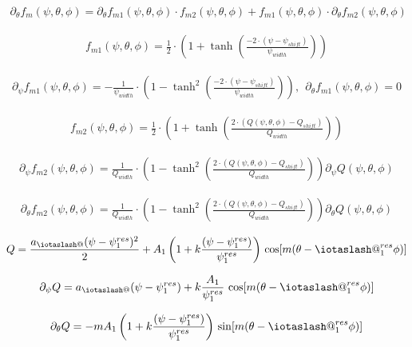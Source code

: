 \documentclass[11pt,a4paper,oneside]{article}
\makeatletter
\newcommand{\iotaslash}{{\mathpalette\iotaslash@\relax}}
\newcommand{\iotaslash@}[2]{
  \raisebox{-0.6\height}[0pt][0pt]{%
    \rotatebox[origin=Bl]{15}{$\m@th#1{\mkern-1mu\mathchar'26}$}%
  }%
  \mkern-9.5mu\nonscript\mkern-1mu
  \iota
  \mkern1mu
}
\makeatother
\begin{document}
\begin{align}
 \partial_\theta f_m(\psi,\theta,\phi)= \partial_\theta f_{m1}(\psi,\theta,\phi)\cdot f_{m2}(\psi,\theta,\phi)+f_{m1}(\psi,\theta,\phi)\cdot  \partial_\theta f_{m2}(\psi,\theta,\phi)
\end{align}

\begin{align}
f_{m1}(\psi,\theta,\phi)=\frac{1}{2} \cdot \left(1 + \tanh\left(\frac{-2 \cdot (\psi - \psi_{shift})}{\psi_{width}}\right)\right)
\end{align}

\begin{align}
\partial_\psi f_{m1}(\psi,\theta,\phi)=-\frac{1}{\psi_{width}} \cdot \left(1 - \tanh^2\left(\frac{-2 \cdot (\psi - \psi_{shift})}{\psi_{width}}\right)\right),\ \ \partial_\theta f_{m1}(\psi,\theta,\phi)=0
\end{align}

\begin{align}
f_{m2}(\psi,\theta,\phi)=\frac{1}{2} \cdot \left(1 + \tanh\left(\frac{2 \cdot (Q(\psi,\theta,\phi) - Q_{shift})}{Q_{width}}\right)\right)
\end{align}

\begin{align}
\partial_\psi f_{m2}(\psi,\theta,\phi)=\frac{1}{Q_{width}} \cdot \left(1 - \tanh^2\left(\frac{2 \cdot (Q(\psi,\theta,\phi) - Q_{shift})}{Q_{width}}\right)\right)\partial_\psi Q(\psi,\theta,\phi)
\end{align}

\begin{align}
\partial_\theta f_{m2}(\psi,\theta,\phi)=\frac{1}{Q_{width}} \cdot \left(1 - \tanh^2\left(\frac{2 \cdot (Q(\psi,\theta,\phi) - Q_{shift})}{Q_{width}}\right)\right)\partial_\theta Q(\psi,\theta,\phi)
\end{align}

\begin{align}
Q=\frac{a_\iotaslash(\psi-\psi^{res}_1)^2}{2}+A_1\left(1+k\frac{(\psi-\psi^{res}_1)}{\psi^{res}_1}\right)\,\cos[m(\theta-\iotaslash^{res}_1\phi)]
\end{align}

\begin{align}
\partial_\psi Q=a_\iotaslash(\psi-\psi^{res}_1)+k\frac{A_1}{\psi^{res}_1}\,\cos[m(\theta-\iotaslash^{res}_1\phi)]
\end{align}

\begin{align}
\partial_\theta Q=-mA_1\left(1+k\frac{(\psi-\psi^{res}_1)}{\psi^{res}_1}\right)\,\sin[m(\theta-\iotaslash^{res}_1\phi)]
\end{align}
\end{document}
